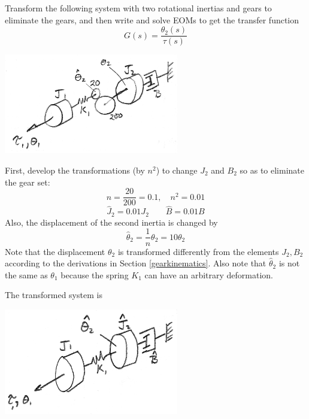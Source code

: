 \begin{Example}
Transform the following system with two rotational inertias and gears to eliminate the gears, and then write and solve EOMs to get the transfer function
\[
G(s) = \frac {\theta_2(s)} {\tau(s)}
\]

\includegraphics[width=3.0in]{figs03/00751.png}  

First, develop the transformations (by $n^2$) to change $J_2$ and $B_2$ so as to eliminate the gear set:
\[
n = \frac{20}{200} = 0.1, \quad n^2 = 0.01 
\]
\[
\hat{J}_2 = 0.01 J_2 \qquad  \hat{B} = 0.01B
\]
Also, the displacement of the second inertia is changed by
\[
\hat{\theta}_2 = \frac{1}{n}\theta_2 = 10\theta_2
\]
Note that the displacement $\theta_2$ is transformed differently from the elements $J_2,B_2$ according to the derivations in Section \ref{gearkinematics}. 
Also note that $\hat{\theta}_2$ is not the same as $\theta_1$ because the spring $K_1$ can have an arbitrary deformation. 

The transformed system is 

\includegraphics[width=3.0in]{figs03/00752.png}  


\end{Example}

